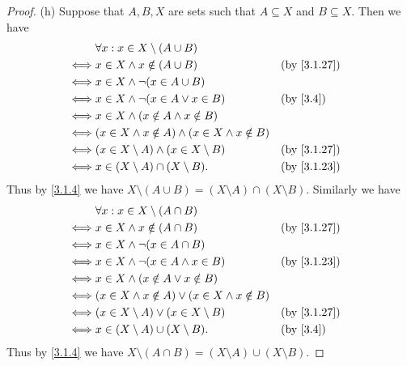 \begin{proof}{(h)}
  Suppose that \(A, B, X\) are sets such that \(A \subseteq X\) and \(B \subseteq X\).
  Then we have
  \begin{align*}
         & \forall x : x \in X \setminus (A \cup B)                                     \\
    \iff & x \in X \land x \notin (A \cup B)                           &  & \by{3.1.27} \\
    \iff & x \in X \land \lnot (x \in A \cup B)                                         \\
    \iff & x \in X \land \lnot (x \in A \lor x \in B)                  &  & \by{3.4}    \\
    \iff & x \in X \land (x \notin A \land x \notin B)                                  \\
    \iff & (x \in X \land x \notin A) \land (x \in X \land x \notin B)                  \\
    \iff & (x \in X \setminus A) \land (x \in X \setminus B)           &  & \by{3.1.27} \\
    \iff & x \in (X \setminus A) \cap (X \setminus B).                 &  & \by{3.1.23}
  \end{align*}
  Thus by \cref{3.1.4} we have \(X \setminus (A \cup B) = (X \setminus A) \cap (X \setminus B)\).
  Similarly we have
  \begin{align*}
         & \forall x : x \in X \setminus (A \cap B)                                    \\
    \iff & x \in X \land x \notin (A \cap B)                          &  & \by{3.1.27} \\
    \iff & x \in X \land \lnot (x \in A \cap B)                                        \\
    \iff & x \in X \land \lnot (x \in A \land x \in B)                &  & \by{3.1.23} \\
    \iff & x \in X \land (x \notin A \lor x \notin B)                                  \\
    \iff & (x \in X \land x \notin A) \lor (x \in X \land x \notin B)                  \\
    \iff & (x \in X \setminus A) \lor (x \in X \setminus B)           &  & \by{3.1.27} \\
    \iff & x \in (X \setminus A) \cup (X \setminus B).                &  & \by{3.4}
  \end{align*}
  Thus by \cref{3.1.4} we have \(X \setminus (A \cap B) = (X \setminus A) \cup (X \setminus B)\).
\end{proof}

